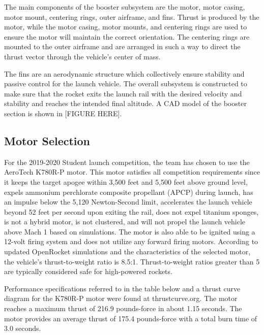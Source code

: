 The main components of the booster subsystem are the motor, motor casing, motor mount, centering rings, outer airframe, and fins. Thrust is produced by the motor, while the motor casing, motor mounts, and centering rings are used to ensure the motor will maintain the correct orientation. The centering rings are mounted to the outer airframe and are arranged in such a way to direct the thrust vector through the vehicle’s center of mass.

The fins are an aerodynamic structure which collectively ensure stability and passive control for the launch vehicle. The overall subsystem is constructed to make sure that the rocket exits the launch rail with the desired velocity and stability and reaches the intended final altitude. A CAD model of the booster section is shown in [FIGURE HERE].

    \subsection{Motor Selection}
For the 2019-2020 Student launch competition, the team has chosen to use the AeroTech K780R-P motor. This motor satisfies all competition requirements since it keeps the target apogee within 3,500 feet and 5,500 feet above ground level, expels ammonium perchlorate composite propellant (APCP) during launch, has an impulse below the 5,120 Newton-Second limit, accelerates the launch vehicle beyond 52 feet per second upon exiting the rail, does not expel titanium sponges, is not a hybrid motor, is not clustered, and will not propel the launch vehicle above Mach 1 based on simulations. The motor is also able to be ignited using a 12-volt firing system and does not utilize any forward firing motors. According to updated OpenRocket simulations and the characteristics of the selected motor, the vehicle’s thrust-to-weight ratio is 8.5:1. Thrust-to-weight ratios greater than 5 are typically considered safe for high-powered rockets.

Performance specifications referred to in the table below and a thrust curve diagram for the K780R-P motor were found at thrustcurve.org. The motor reaches a maximum thrust of 216.9 pounds-force in about 1.15 seconds. The motor provides an average thrust of 175.4 pounds-force with a total burn time of 3.0 seconds.

